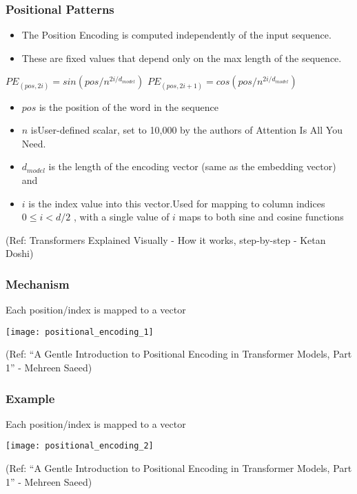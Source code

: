 \begin{frame}[fragile]\frametitle{Positional Patterns}

\begin{itemize}
\item The Position Encoding is computed independently of the input sequence. 
\item These are fixed values that depend only on the max length of the sequence. 
\end{itemize}

$PE_{(pos,2i)} = sin(pos/n^{2i/d_{model}})$
$PE_{(pos,2i+1)} = cos(pos/n^{2i/d_{model}})$

\begin{itemize}
\item $pos$ is the position of the word in the sequence
\item $n$ isUser-defined scalar, set to 10,000 by the authors of Attention Is All You Need.
\item $d_{model}$ is the length of the encoding vector (same as the embedding vector) and
\item $i$ is the index value into this vector.Used for mapping to column indices $0 \leq i < d/2$ , with a single value of $i$
 maps to both sine and cosine functions
\end{itemize}

{\tiny (Ref: Transformers Explained Visually - How it works, step-by-step - Ketan Doshi)}

\end{frame}

\begin{frame}[fragile]\frametitle{Mechanism}

Each position/index is mapped to a vector

\begin{center}
\texttt{[image: positional\_encoding\_1]}


{\tiny (Ref: ``A Gentle Introduction to Positional Encoding in Transformer Models, Part 1'' - Mehreen Saeed)}
\end{center}		

\end{frame}

\begin{frame}[fragile]\frametitle{Example}

Each position/index is mapped to a vector

\begin{center}
\texttt{[image: positional\_encoding\_2]}


{\tiny (Ref: ``A Gentle Introduction to Positional Encoding in Transformer Models, Part 1'' - Mehreen Saeed)}
\end{center}		

\end{frame}


